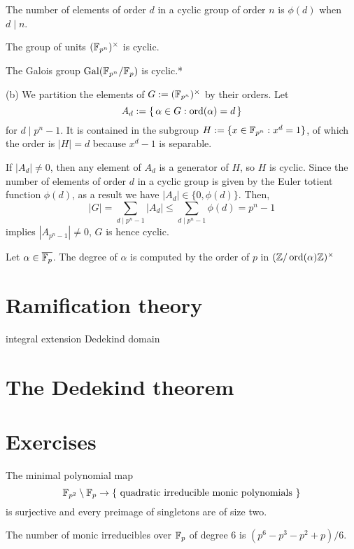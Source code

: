\documentclass{../../large}
\begin{document}
\begin{prb}
\begin{parts}
\item The number of elements of order $d$ in a cyclic group of order $n$ is $\phi(d)$ when $d\mid n$.
\item The group of units $(\mathbb{F}_{p^n})^\times$ is cyclic.
\item The Galois group $\operatorname{Gal}(\mathbb{F}_{p^n}/\mathbb{F}_p)$ is cyclic.*
\end{parts}
\end{prb}
\begin{pf}
(b)
We partition the elements of $G:=(\mathbb{F}_{p^n})^\times$ by their orders.
Let
\[A_d:=\{\,\alpha\in G:\operatorname{ord}(\alpha)=d\,\}\]
for $d\mid p^n-1$.
It is contained in the subgroup $H:=\{x\in\mathbb{F}_{p^n}:x^d=1\}$, of which the order is $|H|=d$ because $x^d-1$ is separable.

If $|A_d|\ne0$, then any element of $A_d$ is a generator of $H$, so $H$ is cyclic.
Since the number of elements of order $d$ in a cyclic group is given by the Euler totient function $\phi(d)$, as a result we have $|A_d|\in\{0,\phi(d)\}$.
Then,
\[|G|=\sum_{d\mid p^n-1}|A_d|\le\sum_{d\mid p^n-1}\phi(d)=p^n-1\]
implies $|A_{p^n-1}|\ne0$, $G$ is hence cyclic.
\end{pf}

\begin{prb}
Let $\alpha\in\overline{\mathbb{F}_p}$.
The degree of $\alpha$ is computed by the order of $p$ in $(\mathbb{Z}/\operatorname{ord}(\alpha)\mathbb{Z})^\times$
\end{prb}


\section{Ramification theory}
\begin{prb}
\end{prb}
integral extension
Dedekind domain


\section{The Dedekind theorem}






\section*{Exercises}
\begin{prb}
The minimal polynomial map
\[\mathbb{F}_{p^2}\setminus\mathbb{F}_p\to\{\text{ quadratic irreducible monic polynomials }\}\]
is surjective and every preimage of singletons are of size two.
\begin{parts}
\item The number of monic irreducibles over $\mathbb{F}_p$ of degree 6 is $(p^6-p^3-p^2+p)/6$.
\end{parts}
\end{prb}
\end{document}

